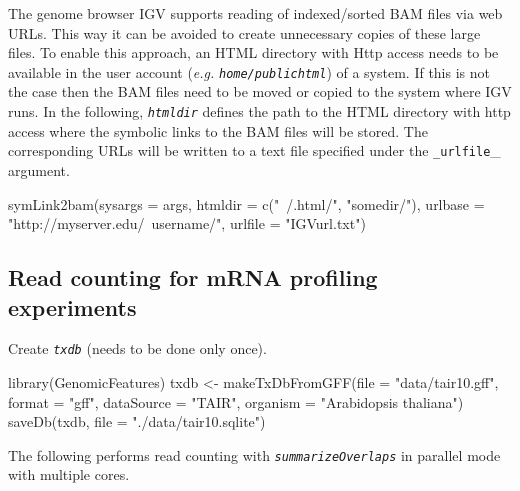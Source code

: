 \documentclass[14pt,]{article}
\newcommand{\hlstr}[1]{\textcolor[rgb]{0.251,0.627,0.251}{#1}}%
\newcommand{\hlstd}[1]{\textcolor[rgb]{0.251,0.251,0.251}{#1}}%
\newcommand{\hlkwc}[1]{\textcolor[rgb]{0.251,0.251,0.251}{#1}}%
\newcommand{\hlkwd}[1]{\textcolor[rgb]{0.878,0.439,0.125}{#1}}%
\newenvironment{Shaded}{\begin{myshaded}}{\end{myshaded}}
\newcommand{\KeywordTok}[1]{\hlkwd{#1}}
\newcommand{\DataTypeTok}[1]{\hlkwc{#1}}
\newcommand{\StringTok}[1]{\hlstr{#1}}
\newcommand{\NormalTok}[1]{\hlstd{#1}}
\begin{document}
The genome browser IGV supports reading of indexed/sorted BAM files via web URLs. This way it can be avoided to create unnecessary copies of these large files. To enable this approach, an HTML directory with Http access needs to be available in the user account (\emph{e.g.} \emph{\texttt{home/publichtml}}) of a system. If this is not the case then the BAM files need to be moved or copied to the system where IGV runs. In the following, \emph{\texttt{htmldir}} defines the path to the HTML directory with http access where the symbolic links to the BAM files will be stored. The corresponding URLs will be written to a text file specified under the \texttt{\_urlfile}\_ argument.

\begin{Shaded}
\begin{Highlighting}[]
\KeywordTok{symLink2bam}\NormalTok{(}\DataTypeTok{sysargs =}\NormalTok{ args, }\DataTypeTok{htmldir =} \KeywordTok{c}\NormalTok{(}\StringTok{"~/.html/"}\NormalTok{, }\StringTok{"somedir/"}\NormalTok{), }\DataTypeTok{urlbase =} \StringTok{"http://myserver.edu/~username/"}\NormalTok{, }
    \DataTypeTok{urlfile =} \StringTok{"IGVurl.txt"}\NormalTok{)}
\end{Highlighting}
\end{Shaded}

\hypertarget{read-counting-for-mrna-profiling-experiments}{%
\subsection{Read counting for mRNA profiling experiments}\label{read-counting-for-mrna-profiling-experiments}}

Create \emph{\texttt{txdb}} (needs to be done only once).

\begin{Shaded}
\begin{Highlighting}[]
\KeywordTok{library}\NormalTok{(GenomicFeatures)}
\NormalTok{txdb <-}\StringTok{ }\KeywordTok{makeTxDbFromGFF}\NormalTok{(}\DataTypeTok{file =} \StringTok{"data/tair10.gff"}\NormalTok{, }\DataTypeTok{format =} \StringTok{"gff"}\NormalTok{, }\DataTypeTok{dataSource =} \StringTok{"TAIR"}\NormalTok{, }
    \DataTypeTok{organism =} \StringTok{"Arabidopsis thaliana"}\NormalTok{)}
\KeywordTok{saveDb}\NormalTok{(txdb, }\DataTypeTok{file =} \StringTok{"./data/tair10.sqlite"}\NormalTok{)}
\end{Highlighting}
\end{Shaded}

The following performs read counting with \emph{\texttt{summarizeOverlaps}} in parallel mode with multiple cores.
\end{document}

